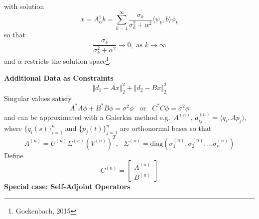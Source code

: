\documentclass[
paper=A6,landscape,
fontsize=11pt, %
pagesize, %
parskip=half-, %
]{scrartcl} %
\theoremstyle{mythmstyle} %
\begin{document}
with solution 
\[
x= A_{\alpha}^{\dagger}b=\sum_{k=1}^{\infty}\frac{\sigma_{k}}{\sigma_{k}^{2}+\alpha^2}\langle \psi_k , b \rangle \phi_{k}
\]
so that  
\[
\frac{\sigma_{k}}{\sigma_{k}^{2}+\alpha^2}\rightarrow0,\text{ as }k\rightarrow\infty
\]
and $\alpha$ restricts the solution space\footnote{\footnotesize Gockenbach, 2015}.

\clearpage
{\large \bf Additional Data as Constraints}\\
\[
\left\Vert d_1-Ax\right\Vert _2^{2}+\left\Vert d_2-Bx\right\Vert _2^{2}
\]
Singular values satisfy
\[   A^{*}A\phi+B^{*}B\phi =\sigma^{2}\phi  \ \  \ \ \mbox{or} \ \ \ \  C^{*}C\phi= \sigma^{2}\phi\]
and can be approximated with a Galerkin method  e.g.\ $A^{(n)}$,  $a_{ij}^{(n)}  = \langle q_i, Ap_j \rangle \nonumber $, where  $\{q_i(s)\}_{i=1}^{n}$ and $\{p_j(t)\}_{j=1}^{n}$  are orthonormal bases so that $$A^{(n)}=U^{(n)}\Sigma^{(n)}\left(V^{(n)}\right)^T, \ \ \ \Sigma^{(n)}=\text{diag}\left(\sigma_1^{(n)}, \sigma_2^{(n)}, \dots \sigma_n^{(n)}\right)$$
Define
$$C^{(n)}=\begin{bmatrix} A^{(n)}\\ B^{(n)} \end{bmatrix}$$
\clearpage
{\large \bf Special case: Self-Adjoint Operators }
\end{document}
